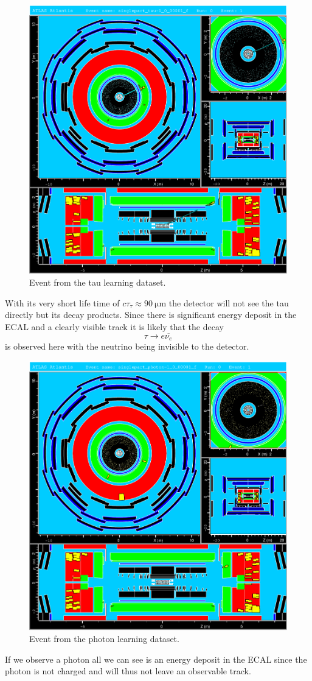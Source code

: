 \documentclass[11pt,a4paper,notitlepage]{scrartcl}
\begin{document}
\begin{figure}[H]
	\centering
	\includegraphics[width=.8\linewidth]{atlantis/tau_testing}
	\caption{Event from the tau learning dataset.}
\end{figure} 
With its very short life time of $c\tau_\tau\approx \SI{90}{\micro\m}$ the detector will not see the tau directly but its decay products. Since there is significant energy deposit in the ECAL and a clearly visible track it is likely that the decay $$\tau\to e\overline{\nu_e}$$ is observed here with the neutrino being invisible to the detector.

\begin{figure}[H]
	\centering
	\includegraphics[width=.8\linewidth]{atlantis/photon_testing}
	\caption{Event from the photon learning dataset.}
\end{figure} 
If we observe a photon all we can see is an energy deposit in the ECAL since the photon is not charged and will thus not leave an observable track.
\end{document}

